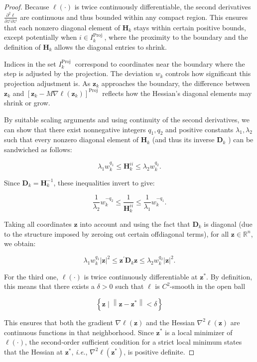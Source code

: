 \documentclass{article}
\theoremstyle{plain}
\theoremstyle{definition}
\def \H {\mathbf{H}}
\def \ie {\textit{i.e.}}
\def \H {\mathbf{H}}
\def \H {\mathbf{H}}
\def \D {\mathbf{D}}
\begin{document}
\begin{proof}
Because $\ell(\cdot)$ is twice continuously differentiable, the second derivatives $\frac{\partial^2 \ell}{\partial z^i \partial z^i}$ are continuous and thus bounded within any compact region. This ensures that each nonzero diagonal element of $\H_k$ stays within certain positive bounds, except potentially when $i \in I_k^{\text {Proj }}$, where the proximity to the boundary and the definition of $\H_k$ allows the diagonal entries to shrink.

Indices in the set $I_k^{\text {Proj }}$ correspond to coordinates near the boundary where the step is adjusted by the projection. The deviation $w_k$ controls how significant this projection adjustment is. As $\mathbf{z}_k$ approaches the boundary, the difference between $\mathbf{z}_k$ and $\left[\mathbf{z}_k-M \nabla \ell\left(\mathbf{z}_k\right)\right]^{\text {Proj }}$ reflects how the Hessian's diagonal elements may shrink or grow.

By suitable scaling arguments and using continuity of the second derivatives, we can show that there exist nonnegative integers $q_1, q_2$ and positive constants $\lambda_1, \lambda_2$ such that every nonzero diagonal element of $\H_k$ (and thus its inverse $\D_k$ ) can be sandwiched as follows:

\[
  \lambda_1 w_k^{q_1} \leq \H_k^{i i} \leq \lambda_2 w_k^{q_2}.
\]


Since $\D_k=\H_k^{-1}$, these inequalities invert to give:

\[
  \frac{1}{\lambda_2} w_k^{-q_2} \leq \frac{1}{\H_k^{i i}} \leq \frac{1}{\lambda_1} w_k^{-q_1}.
\]


Taking all coordinates $\mathbf{z}$ into account and using the fact that $\D_k$ is diagonal (due to the structure imposed by zeroing out certain offdiagonal terms), for all $\mathbf{z} \in \mathbb{R}^n$, we obtain:

\[
  \lambda_1 w_k^{q_1}|\mathbf{z}|^2 \leq \mathbf{z}^{\prime} \D_k \mathbf{z} \leq \lambda_2 w_k^{q_2}|\mathbf{z}|^2.
\]


For the third one, $\ell(\cdot)$ is twice continuously differentiable at $\mathbf{z}^*$. By definition, this means that there exists a $\delta>0$ such that $\ell$ is $C^2$-smooth in the open ball

\[
  \left\{\mathbf{z} \mid\left\|\mathbf{z}-\mathbf{z}^*\right\|<\delta\right\}
\]


This ensures that both the gradient $\nabla \ell(\mathbf{z})$ and the Hessian $\nabla^2 \ell(\mathbf{z})$ are continuous functions in that neighborhood. Since $\mathbf{z}^*$ is a local minimizer of $\ell(\cdot)$, the second-order sufficient condition for a strict local minimum states that the Hessian at $\mathbf{z}^*$, \ie, $\nabla^2 \ell\left(\mathbf{z}^*\right)$, 
is positive definite. 


\end{proof}
\end{document}
